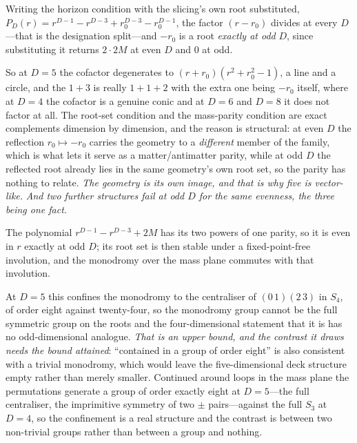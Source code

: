 \documentclass[11pt]{article}
\begin{document}
Writing the horizon condition with the slicing's own root substituted, $P_{D}(r)=r^{D-1}-r^{D-3}+r_{0}^{D-3}-r_{0}^{D-1}$, the factor $(r-r_{0})$ divides at every $D$---that is the designation split---and $-r_{0}$ is a root \emph{exactly at odd} $D$, since substituting it returns $2\cdot 2M$ at even $D$ and $0$ at odd. 

So at $D=5$ the cofactor degenerates to $(r+r_{0})(r^{2}+r_{0}^{2}-1)$, a line and a circle, and the $1+3$ is really $1+1+2$ with the extra one being $-r_{0}$ itself, where at $D=4$ the cofactor is a genuine conic and at $D=6$ and $D=8$ it does not factor at all. The root-set condition and the mass-parity condition are exact complements dimension by dimension, and the reason is structural: at even $D$ the reflection $r_{0}\mapsto-r_{0}$ carries the geometry to a \emph{different} member of the family, which is what lets it serve as a matter/antimatter parity, while at odd $D$ the reflected root already lies in the same geometry's own root set, so the parity has nothing to relate. \emph{The geometry is its own image, and that is why five is vector-like.} \emph{And two further structures fail at odd $D$ for the same evenness, the three being one fact.} 

The polynomial $r^{D-1}-r^{D-3}+2M$ has its two powers of one parity, so it is even in $r$ exactly at odd $D$; its root set is then stable under a fixed-point-free involution, and the monodromy over the mass plane commutes with that involution. 

At $D=5$ this confines the monodromy to the centraliser of $(0\,1)(2\,3)$ in $S_{4}$, of order eight against twenty-four, so the
monodromy group cannot be the full symmetric group on the roots and the four-dimensional statement that it is has no odd-dimensional analogue. \emph{That is an upper bound, and the contrast it draws needs the bound attained}: ``contained in a group of order eight'' is also consistent with a trivial monodromy, which would leave the five-dimensional deck structure empty rather than merely smaller. Continued around loops in the mass plane the permutations generate a group of order exactly eight at $D=5$---the full centraliser, the imprimitive symmetry of two $\pm$ pairs---against the full $S_3$ at $D=4$, so the confinement is a real structure and the contrast is between two non-trivial groups rather than between a group and nothing. 
\end{document}
